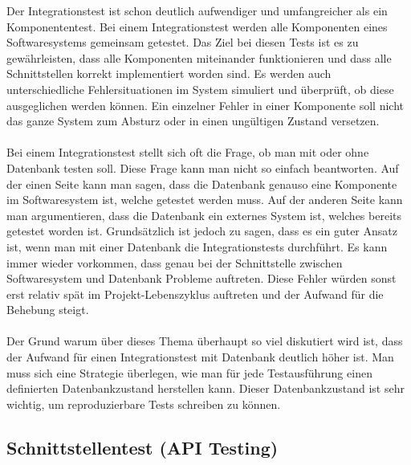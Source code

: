 Der Integrationstest ist schon deutlich aufwendiger und umfangreicher als ein Komponententest. Bei einem Integrationstest werden alle Komponenten eines Softwaresystems gemeinsam getestet. Das Ziel bei diesen Tests ist es zu gewährleisten, dass alle Komponenten miteinander funktionieren und dass alle Schnittstellen korrekt implementiert worden sind. Es werden auch unterschiedliche Fehlersituationen im System simuliert und überprüft, ob diese ausgeglichen werden können. Ein einzelner Fehler in einer Komponente soll nicht das ganze System zum Absturz oder in einen ungültigen Zustand versetzen. \\
\\
Bei einem Integrationstest stellt sich oft die Frage, ob man mit oder ohne Datenbank testen soll. Diese Frage kann man nicht so einfach beantworten. Auf der einen Seite kann man sagen, dass die Datenbank genauso eine Komponente im Softwaresystem ist, welche getestet werden muss. Auf der anderen Seite kann man argumentieren, dass die Datenbank ein externes System ist, welches bereits getestet worden ist. Grundsätzlich ist jedoch zu sagen, dass es ein guter Ansatz ist, wenn man mit einer Datenbank die Integrationstests durchführt. Es kann immer wieder vorkommen, dass genau bei der Schnittstelle zwischen Softwaresystem und Datenbank Probleme auftreten. Diese Fehler würden sonst erst relativ spät im Projekt-Lebenszyklus auftreten und der Aufwand für die Behebung steigt.\\
\\
Der Grund warum über dieses Thema überhaupt so viel diskutiert wird ist, dass der Aufwand für einen Integrationstest mit Datenbank deutlich höher ist. Man muss sich eine Strategie überlegen, wie man für jede Testausführung einen definierten Datenbankzustand herstellen kann. Dieser Datenbankzustand ist sehr wichtig, um reproduzierbare Tests schreiben zu können. 


\subsection{Schnittstellentest (API Testing)}

